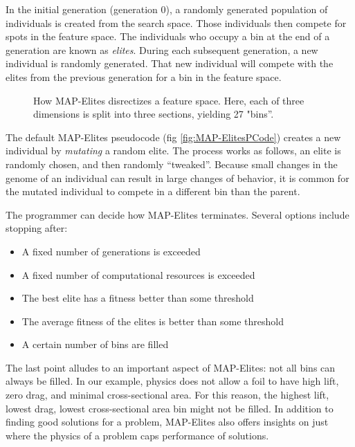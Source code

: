 \documentclass{sig-alternate}
\begin{document}
In the initial generation (generation 0), a randomly generated population of individuals is created from the search space.
Those individuals then compete for spots in the feature space.
The individuals who occupy a bin at the end of a generation are known as \textit{elites}.
During each subsequent generation, a new individual is randomly generated.
That new individual will compete with the elites from the previous generation for a bin in the feature space.

\begin{figure}[tb]
\centering
{}
\caption{How MAP-Elites disrectizes a feature space. Here, each of three dimensions is split into three sections, yielding 27 "bins''.}
\label{fig:FeatureSpace}
\end{figure}

The default MAP-Elites pseudocode (fig \ref{fig:MAP-ElitesPCode}) creates a new individual by \textit{mutating} a random elite.
The process works as follows, an elite is randomly chosen, and then randomly ``tweaked''. 
Because small changes in the genome of an individual can result in large changes of behavior, it is common for the mutated individual to compete in a different bin than the parent.

The programmer can decide how MAP-Elites terminates.
Several options include stopping after:
\begin{itemize}
  \item A fixed number of generations is exceeded
  \item A fixed number of computational resources is exceeded
  \item The best elite has a fitness better than some threshold
  \item The average fitness of the elites is better than some threshold
  \item A certain number of bins are filled
\end{itemize}
The last point alludes to an important aspect of MAP-Elites: not all bins can always be filled.
In our example, physics does not allow a foil to have high lift, zero drag, and minimal cross-sectional area.
For this reason, the highest lift, lowest drag, lowest cross-sectional area bin might not be filled.
In addition to finding good solutions for a problem, MAP-Elites also offers insights on just where the physics of a problem caps performance of solutions.

\begin{figure*}[!t]
\centering
{}
\caption{Pseudocode of default MAP-Elites. Taken from \cite{Mouret:2015}.}
\label{fig:MAP-ElitesPCode}
\end{figure*}
\end{document}
